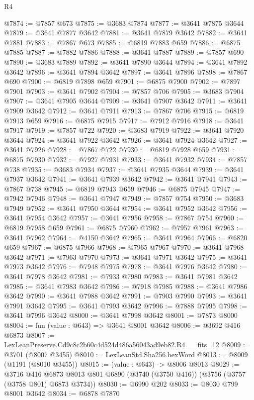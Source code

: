 \begin{lexlean}{R4}
\begin{coremodule}
@7874 := @7857 @673
@7875 := @3683 @7874
@7877 := @3641 @7875 @3644
@7879 := @3641 @7877 @3642
@7881 := @3641 @7879 @3642
@7882 := @3641 @7881
@7883 := @7867 @673
@7885 := @6819 @7883 @659
@7886 := @6875 @7885
@7887 := @7882 @7886
@7888 := @3641 @7887
@7889 := @7857 @690
@7890 := @3683 @7889
@7892 := @3641 @7890 @3644
@7894 := @3641 @7892 @3642
@7896 := @3641 @7894 @3642
@7897 := @3641 @7896
@7898 := @7867 @690
@7900 := @6819 @7898 @659
@7901 := @6875 @7900
@7902 := @7897 @7901
@7903 := @3641 @7902
@7904 := @7857 @706
@7905 := @3683 @7904
@7907 := @3641 @7905 @3644
@7909 := @3641 @7907 @3642
@7911 := @3641 @7909 @3642
@7912 := @3641 @7911
@7913 := @7867 @706
@7915 := @6819 @7913 @659
@7916 := @6875 @7915
@7917 := @7912 @7916
@7918 := @3641 @7917
@7919 := @7857 @722
@7920 := @3683 @7919
@7922 := @3641 @7920 @3644
@7924 := @3641 @7922 @3642
@7926 := @3641 @7924 @3642
@7927 := @3641 @7926
@7928 := @7867 @722
@7930 := @6819 @7928 @659
@7931 := @6875 @7930
@7932 := @7927 @7931
@7933 := @3641 @7932
@7934 := @7857 @738
@7935 := @3683 @7934
@7937 := @3641 @7935 @3644
@7939 := @3641 @7937 @3642
@7941 := @3641 @7939 @3642
@7942 := @3641 @7941
@7943 := @7867 @738
@7945 := @6819 @7943 @659
@7946 := @6875 @7945
@7947 := @7942 @7946
@7948 := @3641 @7947
@7949 := @7857 @754
@7950 := @3683 @7949
@7952 := @3641 @7950 @3644
@7954 := @3641 @7952 @3642
@7956 := @3641 @7954 @3642
@7957 := @3641 @7956
@7958 := @7867 @754
@7960 := @6819 @7958 @659
@7961 := @6875 @7960
@7962 := @7957 @7961
@7963 := @3641 @7962
@7964 := @4150 @3642
@7965 := @3641 @7964
@7966 := @6820 @659
@7967 := @6875 @7966
@7968 := @7965 @7967
@7970 := @3641 @7968 @3642
@7971 := @7963 @7970
@7973 := @3641 @7971 @3642
@7975 := @3641 @7973 @3642
@7976 := @7948 @7975
@7978 := @3641 @7976 @3642
@7980 := @3641 @7978 @3642
@7981 := @7933 @7980
@7983 := @3641 @7981 @3642
@7985 := @3641 @7983 @3642
@7986 := @7918 @7985
@7988 := @3641 @7986 @3642
@7990 := @3641 @7988 @3642
@7991 := @7903 @7990
@7993 := @3641 @7991 @3642
@7995 := @3641 @7993 @3642
@7996 := @7888 @7995
@7998 := @3641 @7996 @3642
@8000 := @3641 @7998 @3642
@8001 := @7873 @8000
@8004 := fun (value : @643) => @3641 @8001 @3642
@8006 := @3692 @416 @6873
@8007 := LexLeanPreserve.Cd9c8c2b60c4d524d486a56043ad9eb82.R4.__fits_12
@8009 := @3701 (@8007 @3455)
@8010 := LexLeanStd.Sha256.hexWord
@8013 := @8009 (@1191 (@8010 @3455))
@8015 := (value : @643) -> @8006 @8013
@8029 := @3716
    @416
    @6873
    @8013
    @801
    @6890
    (@3740 (@3750 @416))
    (@3756 (@3757 (@3758 @801) @6873 @3734))
@8030 := @6990 @202
@8033 := @8030 @799 @8001 @3642
@8034 := @6878 @7870

\end{coremodule}
\end{lexlean}
